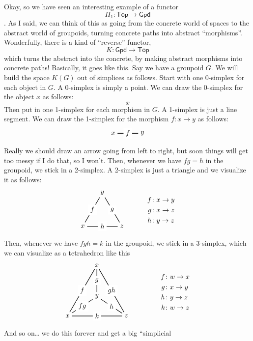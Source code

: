 \documentclass{article}
\begin{document}
Okay, so we have seen an interesting example of a functor
\[\Pi_1\colon\mathsf{Top}\to\mathsf{Gpd}\]. As I said, we can think of
this as going from the concrete world of spaces to the abstract world of
groupoids, turning concrete paths into abstract ``morphisms''.
Wonderfully, there is a kind of ``reverse'' functor,
\[K\colon\mathsf{Gpd}\to\mathsf{Top}\] which turns the abstract into the
concrete, by making abstract morphisms into concrete paths! Basically,
it goes like this. Say we have a groupoid \(G\). We will build the space
\(K(G)\) out of simplices as follows. Start with one 0-simplex for each
object in \(G\). A 0-simplex is simply a point. We can draw the
0-simplex for the object \(x\) as follows: \[x\] Then put in one
1-simplex for each morphism in \(G\). A 1-simplex is just a line
segment. We can draw the 1-simplex for the morphism \(f\colon x\to y\)
as follows: \[
  \begin{tikzpicture}
    \node (x) at (0,0) {$x$};
    \node (y) at (1.5,0) {$y$};
    \draw[thick] (x) to node[fill=white]{$f$} (y);
  \end{tikzpicture}
\] Really we should draw an arrow going from left to right, but soon
things will get too messy if I do that, so I won't. Then, whenever we
have \(fg=h\) in the groupoid, we stick in a 2-simplex. A 2-simplex is
just a triangle and we visualize it as follows: \[
  \begin{tikzpicture}
    \node (x) at (0,0) {$x$};
    \node (y) at (1,1.7) {$y$};
    \node (z) at (2,0) {$z$};
    \draw[thick] (x) to node[fill=white]{$f$} (y);
    \draw[thick] (x) to node[fill=white]{$h$} (z);
    \draw[thick] (y) to node[fill=white]{$g$} (z);
    \node at (4,0.8) {$
      \begin{aligned}
        f&\colon x\to y
      \\g&\colon x\to z
      \\h&\colon y\to z
      \end{aligned}
    $};
  \end{tikzpicture}
\] Then, whenever we have \(fgh = k\) in the groupoid, we stick in a
3-simplex, which we can visualize as a tetrahedron like this \[
  \begin{tikzpicture}
    \node (w) at (0,0) {$x$};
    \node (x) at (1.5,2.6,0) {$x$};
    \node (y) at (1.5,1) {$y$};
    \node (z) at (3,0) {$z$};
    \draw[thick] (w) to node[fill=white]{$f$} (x);
    \draw[thick] (x) to node[fill=white]{$g$} (y);
    \draw[thick] (y) to node[fill=white]{$h$} (z);
    \draw[thick] (w) to node[fill=white]{$k$} (z);
    \draw[thick] (w) to node[fill=white]{$fg$} (y);
    \draw[thick] (x) to node[fill=white]{$gh$} (z);
    \node at (5.5,1.2) {$
      \begin{aligned}
        f&\colon w\to x
      \\g&\colon x\to y
      \\h&\colon y\to z
      \\k&\colon w\to z
      \end{aligned}
    $};
  \end{tikzpicture}
\] And so on\ldots{} we do this forever and get a big ``simplicial
\end{document}
